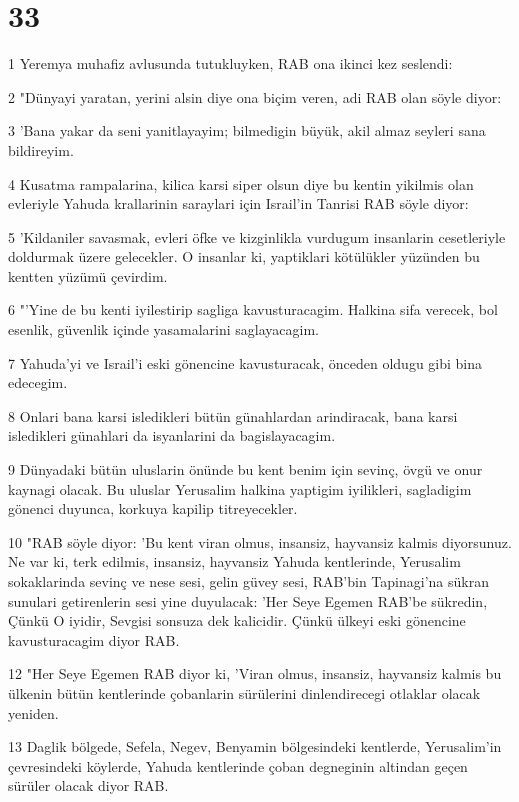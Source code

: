 \chapter{33}

\par 1 Yeremya muhafiz avlusunda tutukluyken, RAB ona ikinci kez seslendi:
\par 2 "Dünyayi yaratan, yerini alsin diye ona biçim veren, adi RAB olan söyle diyor:
\par 3 'Bana yakar da seni yanitlayayim; bilmedigin büyük, akil almaz seyleri sana bildireyim.
\par 4 Kusatma rampalarina, kilica karsi siper olsun diye bu kentin yikilmis olan evleriyle Yahuda krallarinin saraylari için Israil'in Tanrisi RAB söyle diyor:
\par 5 'Kildaniler savasmak, evleri öfke ve kizginlikla vurdugum insanlarin cesetleriyle doldurmak üzere gelecekler. O insanlar ki, yaptiklari kötülükler yüzünden bu kentten yüzümü çevirdim.
\par 6 "'Yine de bu kenti iyilestirip sagliga kavusturacagim. Halkina sifa verecek, bol esenlik, güvenlik içinde yasamalarini saglayacagim.
\par 7 Yahuda'yi ve Israil'i eski gönencine kavusturacak, önceden oldugu gibi bina edecegim.
\par 8 Onlari bana karsi isledikleri bütün günahlardan arindiracak, bana karsi isledikleri günahlari da isyanlarini da bagislayacagim.
\par 9 Dünyadaki bütün uluslarin önünde bu kent benim için sevinç, övgü ve onur kaynagi olacak. Bu uluslar Yerusalim halkina yaptigim iyilikleri, sagladigim gönenci duyunca, korkuya kapilip titreyecekler.
\par 10 "RAB söyle diyor: 'Bu kent viran olmus, insansiz, hayvansiz kalmis diyorsunuz. Ne var ki, terk edilmis, insansiz, hayvansiz Yahuda kentlerinde, Yerusalim sokaklarinda sevinç ve nese sesi, gelin güvey sesi, RAB'bin Tapinagi'na sükran sunulari getirenlerin sesi yine duyulacak: 'Her Seye Egemen RAB'be sükredin, Çünkü O iyidir, Sevgisi sonsuza dek kalicidir. Çünkü ülkeyi eski gönencine kavusturacagim diyor RAB.
\par 12 "Her Seye Egemen RAB diyor ki, 'Viran olmus, insansiz, hayvansiz kalmis bu ülkenin bütün kentlerinde çobanlarin sürülerini dinlendirecegi otlaklar olacak yeniden.
\par 13 Daglik bölgede, Sefela, Negev, Benyamin bölgesindeki kentlerde, Yerusalim'in çevresindeki köylerde, Yahuda kentlerinde çoban degneginin altindan geçen sürüler olacak diyor RAB.

